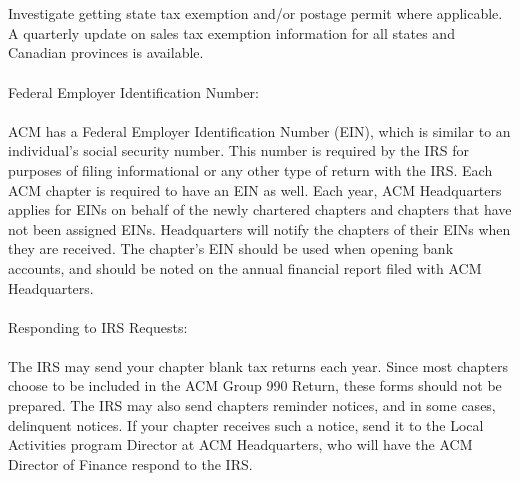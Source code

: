 \\
\\
Investigate getting state tax exemption and/or postage permit where applicable. A quarterly update on sales tax exemption information for all states and Canadian provinces is available.
\\
\\
Federal Employer Identification Number: 
\\
\\
ACM has a Federal Employer Identification Number (EIN), which is similar to an individual's social security number. This number is required by the IRS for purposes of filing informational or any other type of return with the IRS. Each ACM chapter is required to have an EIN as well. Each year, ACM Headquarters applies for EINs on behalf of the newly chartered chapters and chapters that have not been assigned EINs. Headquarters will notify the chapters of their EINs when they are received. The chapter's EIN should be used when opening bank accounts, and should be noted on the annual financial report filed with ACM Headquarters.
\\
\\
Responding to IRS Requests: 
\\
\\
The IRS may send your chapter blank tax returns each year. Since most chapters choose to be included in the ACM Group 990 Return, these forms should not be prepared. The IRS may also send chapters reminder notices, and in some cases, delinquent notices. If your chapter receives such a notice, send it to the Local Activities program Director at ACM Headquarters, who will have the ACM Director of Finance respond to the IRS.


